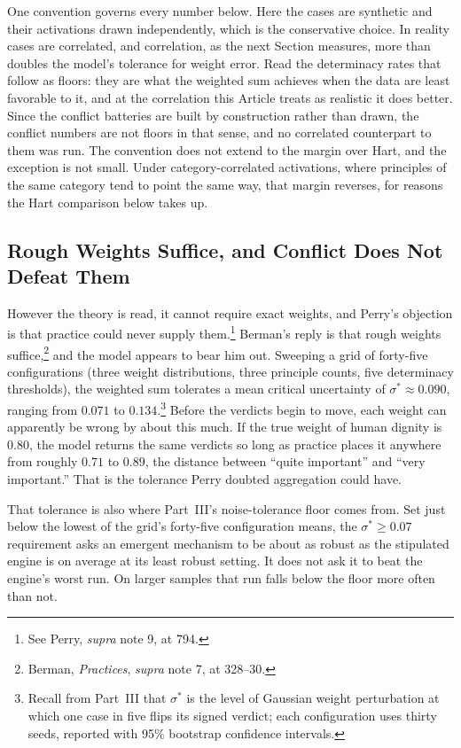 One convention governs every number below. Here the cases are synthetic and their activations drawn independently,
which is the conservative choice. In reality cases are correlated, and
correlation, as the next Section measures, more than doubles the model's
tolerance for weight error. Read the determinacy rates that follow as floors: they are what the weighted
sum achieves when the data are least favorable to it, and at the
correlation this Article treats as realistic it does better. Since the
conflict batteries are built by construction rather than drawn, the conflict
numbers are not floors in that sense, and no correlated counterpart to them
was run. The convention does not
extend to the margin over Hart, and the exception is not small. Under
category-correlated activations, where principles of the same category tend to
point the same way, that margin reverses, for reasons the Hart comparison
below takes up.

\subsection{Rough Weights Suffice, and Conflict Does Not Defeat Them}

However the theory is read, it cannot require exact weights, and Perry's
objection is that practice could never supply them.\footnote{See Perry, \textit{supra} note 9, at 794.} Berman's reply is that rough weights suffice,\footnote{Berman,
\textit{Practices}, \textit{supra} note 7, at 328--30.} and the model appears to bear him out. Sweeping a grid of forty-five configurations (three weight
distributions, three principle counts, five determinacy thresholds), the
weighted sum tolerates a mean critical uncertainty of $\sigma^{*} \approx
0.090$, ranging from $0.071$ to $0.134$.\footnote{Recall from Part~III that
$\sigma^{*}$ is the level of Gaussian weight perturbation at which one case
in five flips its signed verdict; each configuration uses thirty seeds,
reported with 95\% bootstrap confidence intervals.} Before the verdicts begin
to move, each weight can apparently be wrong by about this much. If the true weight of human
dignity is $0.80$, the model returns the same verdicts so long as practice
places it anywhere from roughly $0.71$ to $0.89$, the distance between
``quite important'' and ``very important.'' That is the tolerance Perry
doubted aggregation could have.

That tolerance is also where Part~III's noise-tolerance floor comes from. Set just below
the lowest of the grid's forty-five configuration means, the $\sigma^{*} \geq
0.07$ requirement asks an emergent mechanism to be about as robust as the
stipulated engine is on average at its least robust setting. It does not ask
it to beat the engine's worst run. On larger samples that run falls below the
floor more often than not.

